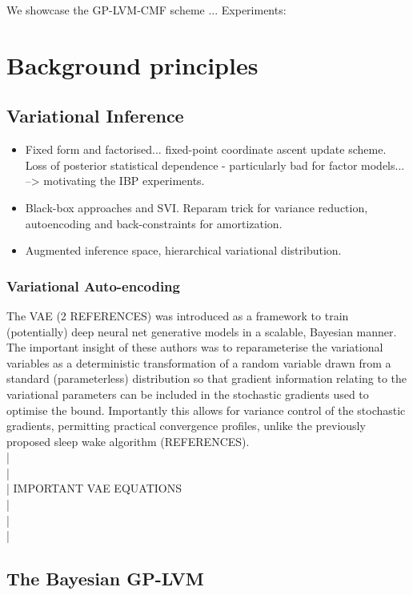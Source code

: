 \documentclass[]{article}
\begin{document}
We showcase the GP-LVM-CMF scheme ...
Experiments:

\section{Background principles}\label{sec:background}

\subsection{Variational Inference}\label{subsec:vi}

\begin{itemize}
  \item Fixed form and factorised... fixed-point coordinate ascent update scheme. Loss of posterior statistical dependence - particularly bad for factor models... --> motivating the IBP experiments.
  \item Black-box approaches and SVI. Reparam trick for variance reduction, autoencoding and back-constraints for amortization.
  \item Augmented inference space, hierarchical variational distribution.
\end{itemize}

\subsubsection{Variational Auto-encoding}

The VAE (2 REFERENCES) was introduced as a framework to train (potentially) deep neural net generative models in a scalable, Bayesian manner. The important insight of these authors was to reparameterise the variational variables as a deterministic transformation of a random variable drawn from a standard (parameterless) distribution so that gradient information relating to the variational parameters can be included in the stochastic gradients used to optimise the bound. Importantly this allows for variance control of the stochastic gradients, permitting practical convergence profiles, unlike the previously proposed sleep wake algorithm (REFERENCES).
\\ |
\\ |
\\ |
IMPORTANT VAE EQUATIONS
\\ |
\\ |
\\ |

\subsection{The Bayesian GP-LVM}\label{subsec:gplvm}
\end{document}
